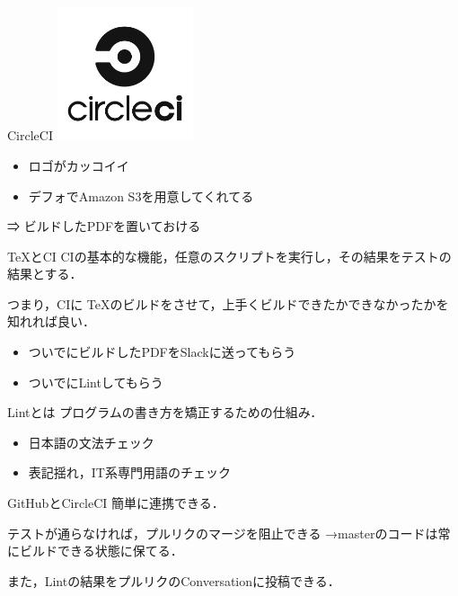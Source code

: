\documentclass{beamer}
\begin{document}
\begin{frame}{CircleCI}
  \includegraphics[width=4cm, bb=0 0 140 137]{img/circle-logo-stacked-black.png}

  \begin{itemize}
    \item ロゴがカッコイイ
    \item デフォでAmazon S3を用意してくれてる
  \end{itemize}

  ⇒ ビルドしたPDFを置いておける
\end{frame}

\begin{frame}{\TeX とCI}
  CIの基本的な機能，任意のスクリプトを実行し，その結果をテストの結果とする．

  つまり，CIに \TeX のビルドをさせて，上手くビルドできたかできなかったかを知れれば良い．

  \begin{itemize}
    \item ついでにビルドしたPDFをSlackに送ってもらう
    \item ついでにLintしてもらう
  \end{itemize}
\end{frame}

\begin{frame}{Lintとは}
  プログラムの書き方を矯正するための仕組み．

  \begin{itemize}
    \item 日本語の文法チェック
    \item 表記揺れ，IT系専門用語のチェック
  \end{itemize}
\end{frame}

\begin{frame}{GitHubとCircleCI}
  簡単に連携できる．

  テストが通らなければ，プルリクのマージを阻止できる
  →masterのコードは常にビルドできる状態に保てる．

  また，Lintの結果をプルリクのConversationに投稿できる．
\end{frame}
\end{document}
